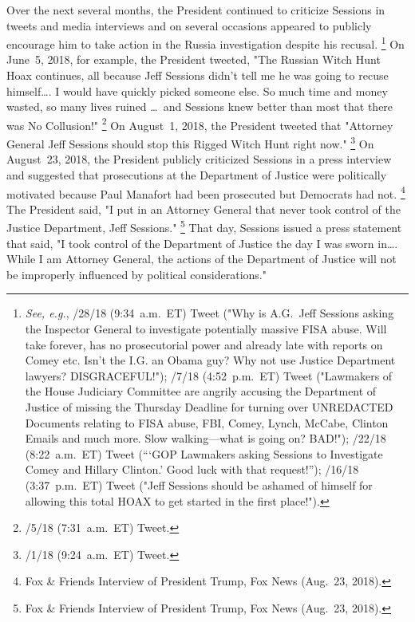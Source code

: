 Over the next several months, the President continued to criticize Sessions in tweets and media interviews and on several occasions appeared to publicly encourage him to take action in the Russia investigation despite his recusal.%
\footnote{\textit{See, e.g.}, /28/18 (9:34~a.m.~ET) Tweet ("Why is A.G.~Jeff Sessions asking the Inspector General to investigate potentially massive FISA abuse.
Will take forever, has no prosecutorial power and already late with reports on Comey etc.
Isn't the I.G. an Obama guy?
Why not use Justice Department lawyers?
DISGRACEFUL!");
/7/18 (4:52~p.m.~ET) Tweet ("Lawmakers of the House Judiciary Committee are angrily accusing the Department of Justice of missing the Thursday Deadline for turning over UNREDACTED Documents relating to FISA abuse, FBI, Comey, Lynch, McCabe, Clinton Emails and much more.
Slow walking---what is going on? BAD!");
/22/18 (8:22~a.m.~ET) Tweet (``\thinspace`GOP Lawmakers asking Sessions to Investigate Comey and Hillary Clinton.' \@FoxNews Good luck with that request!'');
/16/18 (3:37~p.m.~ET) Tweet ("Jeff Sessions should be ashamed of himself for allowing this total HOAX to get started in the first place!").}
On June~5, 2018, for example, the President tweeted, "The Russian Witch Hunt Hoax continues, all because Jeff Sessions didn't tell me he was going to recuse himself\dots. I would have quickly picked someone else.
So much time and money wasted, so many lives ruined \dots\ and Sessions knew better than most that there was No Collusion!"%
\footnote{/5/18 (7:31~a.m.~ET) Tweet.}
On August~1, 2018, the President tweeted that "Attorney General Jeff Sessions should stop this Rigged Witch Hunt right now."%
\footnote{/1/18 (9:24~a.m.~ET) Tweet.}
On August~23, 2018, the President publicly criticized Sessions in a press interview and suggested that prosecutions at the Department of Justice were politically motivated because Paul Manafort had been prosecuted but Democrats had not.%
\footnote{Fox \& Friends Interview of President Trump, Fox News (Aug.~23, 2018).}
The President said, "I put in an Attorney General that never took control of the Justice Department, Jeff Sessions."%
\footnote{Fox \& Friends Interview of President Trump, Fox News (Aug.~23, 2018).}
That day, Sessions issued a press statement that said, "I took control of the Department of Justice the day I was sworn in\dots.
While I am Attorney General, the actions of the Department of Justice will not be improperly influenced by political considerations."%
